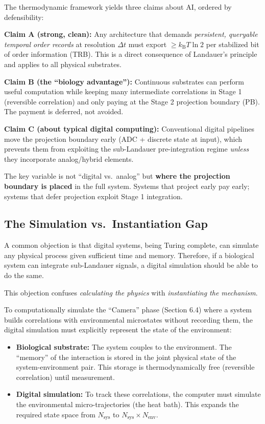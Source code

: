 \documentclass[12pt]{article}
\numberwithin{equation}{section}
\newcommand{\kB}{k_{\mathrm{B}}}
\begin{document}
The thermodynamic framework yields three claims about AI, ordered by defensibility:

\textbf{Claim A (strong, clean):} Any architecture that demands \emph{persistent, queryable temporal order records} at resolution $\Delta t$ must export $\ge \kB T\ln 2$ per stabilized bit of order information (TRB). This is a direct consequence of Landauer's principle and applies to all physical substrates.

\textbf{Claim B (the ``biology advantage''):} Continuous substrates can perform useful computation while keeping many intermediate correlations in Stage 1 (reversible correlation) and only paying at the Stage 2 projection boundary (PB). The payment is deferred, not avoided.

\textbf{Claim C (about typical digital computing):} Conventional digital pipelines move the projection boundary early (ADC + discrete state at input), which prevents them from exploiting the sub-Landauer pre-integration regime \emph{unless} they incorporate analog/hybrid elements.

The key variable is not ``digital vs.\ analog'' but \textbf{where the projection boundary is placed} in the full system. Systems that project early pay early; systems that defer projection exploit Stage 1 integration.

\subsection{The Simulation vs.\ Instantiation Gap}

A common objection is that digital systems, being Turing complete, can simulate any physical process given sufficient time and memory. Therefore, if a biological system can integrate sub-Landauer signals, a digital simulation should be able to do the same.

This objection confuses \emph{calculating the physics} with \emph{instantiating the mechanism}.

To computationally simulate the ``Camera'' phase (Section 6.4) where a system builds correlations with environmental microstates without recording them, the digital simulation must explicitly represent the state of the environment:

\begin{itemize}
\item \textbf{Biological substrate:} The system couples to the environment. The ``memory'' of the interaction is stored in the joint physical state of the system-environment pair. This storage is thermodynamically free (reversible correlation) until measurement.

\item \textbf{Digital simulation:} To track these correlations, the computer must simulate the environmental micro-trajectories (the heat bath). This expands the required state space from $N_{\text{sys}}$ to $N_{\text{sys}} \times N_{\text{env}}$.
\end{itemize}
\end{document}
